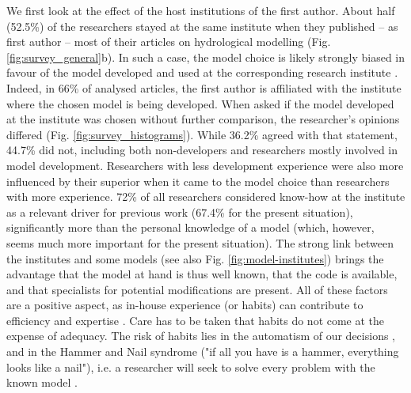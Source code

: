 \documentclass[10pt,a4paper]{article}
\begin{document}
We first look at the effect of the host institutions of the first author. About half (52.5\%) of the researchers stayed at the same institute when they published -- as first author -- most of their articles on hydrological modelling (Fig. \ref{fig:survey_general}b). In such a case, the model choice is likely strongly biased in favour of the model developed and used at the corresponding research institute \citep{Addor2019}. Indeed, in 66\% of analysed articles, the first author is affiliated with the institute where the chosen model is being developed. When asked if the model developed at the institute was chosen without further comparison, the researcher's opinions differed (Fig. \ref{fig:survey_histograms}). While 36.2\% agreed with that statement, 44.7\% did not, including both non-developers and researchers mostly involved in model development. Researchers with less development experience were also more influenced by their superior when it came to the model choice than researchers with more experience. 72\% of all researchers considered know-how at the institute as a relevant driver for previous work (67.4\% for the present situation), significantly more than the personal knowledge of a model (which, however, seems much more important for the present situation). The strong link between the institutes and some models (see also Fig. \ref{fig:model-institutes}) brings the advantage that the model at hand is thus well known, that the code is available, and that specialists for potential modifications are present. All of these factors are a positive aspect, as in-house experience (or habits) can contribute to efficiency and expertise \citep{Babel2019}. Care has to be taken that habits do not come at the expense of adequacy. The risk of habits lies in the automatism of our decisions \citep{Babel2019}, and in the Hammer and Nail syndrome ("if all you have is a hammer, everything looks like a nail"), i.e. a researcher will seek to solve every problem with the known model \citep{Hamalainen2015}.
\end{document}

